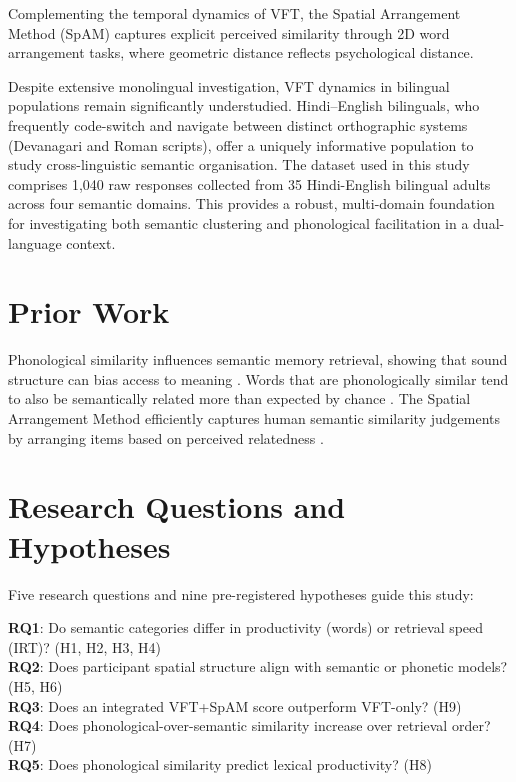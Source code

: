 \documentclass[12pt]{article}
\begin{document}
Complementing the temporal dynamics of VFT, the Spatial Arrangement Method (SpAM) \citep{hout2013} captures explicit perceived similarity through 2D word arrangement tasks, where geometric distance reflects psychological distance. 

Despite extensive monolingual investigation, VFT dynamics in bilingual populations remain significantly understudied. Hindi--English bilinguals, who frequently code-switch and navigate between distinct orthographic systems (Devanagari and Roman scripts), offer a uniquely informative population to study cross-linguistic semantic organisation. The dataset used in this study comprises 1,040 raw responses collected from 35 Hindi-English bilingual adults across four semantic domains. This provides a robust, multi-domain foundation for investigating both semantic clustering and phonological facilitation in a dual-language context.

\section{Prior Work}

Phonological similarity influences semantic memory retrieval, showing that sound structure can bias access to meaning \citep{kumar2022}. Words that are phonologically similar tend to also be semantically related more than expected by chance \citep{dautriche2016}. The Spatial Arrangement Method efficiently captures human semantic similarity judgements by arranging items based on perceived relatedness \citep{hout2013}.

\section{Research Questions and Hypotheses}

Five research questions and nine pre-registered hypotheses guide this study:

\noindent\textbf{RQ1}: Do semantic categories differ in productivity (words) or retrieval speed (IRT)? (H1, H2, H3, H4)\\
\textbf{RQ2}: Does participant spatial structure align with semantic or phonetic models? (H5, H6)\\
\textbf{RQ3}: Does an integrated VFT+SpAM score outperform VFT-only? (H9)\\
\textbf{RQ4}: Does phonological-over-semantic similarity increase over retrieval order? (H7)\\
\textbf{RQ5}: Does phonological similarity predict lexical productivity? (H8)
\end{document}
